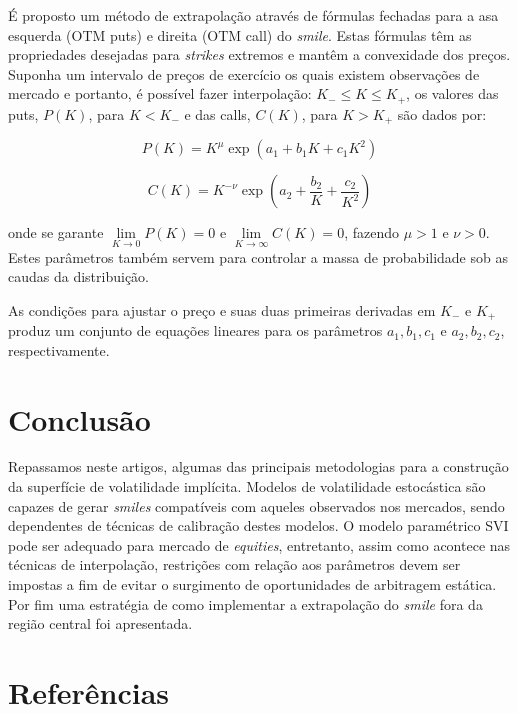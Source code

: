 \documentclass[]{book}
\theoremstyle{definition}
\theoremstyle{definition}
\theoremstyle{definition}
\theoremstyle{remark}
\begin{document}
É proposto um método de extrapolação através de fórmulas fechadas para a asa esquerda (OTM puts) e direita (OTM call) do \emph{smile}. Estas fórmulas têm as propriedades desejadas para \emph{strikes} extremos e mantêm a convexidade dos preços. Suponha um intervalo de preços de exercício os quais existem observações de mercado e portanto, é possível fazer interpolação: \(K_-\leq K \leq K_+\), os valores das puts, \(P(K)\), para \(K<K_-\) e das calls, \(C(K)\), para \(K>K_+\) são dados por:

\begin{equation}
P(K)=K^\mu \exp\left(a_1+b_1K+c_1K^2\right)
\label{eq:pk}
\end{equation}

\begin{equation}
C(K)=K^{-\nu} \exp\left(a_2+\frac{b_2}{K}+\frac{c_2}{K^2}\right)
\label{eq:ck}
\end{equation}

onde se garante \(\lim\limits_{K\rightarrow 0} P(K)=0\) e \(\lim\limits_{K\rightarrow \infty} C(K)=0\), fazendo \(\mu > 1\) e \(\nu > 0\). Estes parâmetros também servem para controlar a massa de probabilidade sob as caudas da distribuição.

As condições para ajustar o preço e suas duas primeiras derivadas em \(K_-\) e \(K_+\) produz um conjunto de equações lineares para os parâmetros \(a_1, b_1, c_1\) e \(a_2, b_2, c_2\), respectivamente.

\hypertarget{conclusao-1}{%
\section{Conclusão}\label{conclusao-1}}

Repassamos neste artigos, algumas das principais metodologias para a construção da superfície de volatilidade implícita. Modelos de volatilidade estocástica são capazes de gerar \emph{smiles} compatíveis com aqueles observados nos mercados, sendo dependentes de técnicas de calibração destes modelos. O modelo paramétrico SVI pode ser adequado para mercado de \emph{equities}, entretanto, assim como acontece nas técnicas de interpolação, restrições com relação aos parâmetros devem ser impostas a fim de evitar o surgimento de oportunidades de arbitragem estática. Por fim uma estratégia de como implementar a extrapolação do \emph{smile} fora da região central foi apresentada.

\hypertarget{referencias}{%
\section{Referências}\label{referencias}}
\end{document}
